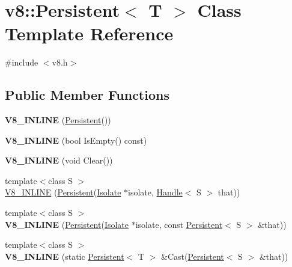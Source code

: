 \hypertarget{classv8_1_1_persistent}{}\section{v8\+:\+:Persistent$<$ T $>$ Class Template Reference}
\label{classv8_1_1_persistent}


{\ttfamily \#include $<$v8.\+h$>$}

\subsection*{Public Member Functions}
\begin{DoxyCompactItemize}
\item 
\hypertarget{classv8_1_1_persistent_ad523a6fc8bf2490020009436519423d0}{}{\bfseries V8\+\_\+\+I\+N\+L\+I\+N\+E} (\hyperlink{classv8_1_1_persistent}{Persistent}())\label{classv8_1_1_persistent_ad523a6fc8bf2490020009436519423d0}

\item 
\hypertarget{classv8_1_1_persistent_aab9f4c157614c45e4dcbf08249707a70}{}{\bfseries V8\+\_\+\+I\+N\+L\+I\+N\+E} (bool Is\+Empty() const)\label{classv8_1_1_persistent_aab9f4c157614c45e4dcbf08249707a70}

\item 
\hypertarget{classv8_1_1_persistent_ab60ff3d06df985c2bbccf32c31370a6a}{}{\bfseries V8\+\_\+\+I\+N\+L\+I\+N\+E} (void Clear())\label{classv8_1_1_persistent_ab60ff3d06df985c2bbccf32c31370a6a}

\item 
{\footnotesize template$<$class S $>$ }\\\hyperlink{classv8_1_1_persistent_a7ca3b3808718378ee842528d5967cb07}{V8\+\_\+\+I\+N\+L\+I\+N\+E} (\hyperlink{classv8_1_1_persistent}{Persistent}(\hyperlink{classv8_1_1_isolate}{Isolate} $\ast$isolate, \hyperlink{classv8_1_1_handle}{Handle}$<$ S $>$ that))
\item 
\hypertarget{classv8_1_1_persistent_ad33f12eb712c670eebd178af718674b7}{}{\footnotesize template$<$class S $>$ }\\{\bfseries V8\+\_\+\+I\+N\+L\+I\+N\+E} (\hyperlink{classv8_1_1_persistent}{Persistent}(\hyperlink{classv8_1_1_isolate}{Isolate} $\ast$isolate, const \hyperlink{classv8_1_1_persistent}{Persistent}$<$ S $>$ \&that))\label{classv8_1_1_persistent_ad33f12eb712c670eebd178af718674b7}

\item 
\hypertarget{classv8_1_1_persistent_a2b22ab835c35c35fea7469b415791744}{}{\footnotesize template$<$class S $>$ }\\{\bfseries V8\+\_\+\+I\+N\+L\+I\+N\+E} (static \hyperlink{classv8_1_1_persistent}{Persistent}$<$ T $>$ \&Cast(\hyperlink{classv8_1_1_persistent}{Persistent}$<$ S $>$ \&that))\label{classv8_1_1_persistent_a2b22ab835c35c35fea7469b415791744}


\end{DoxyCompactItemize}
